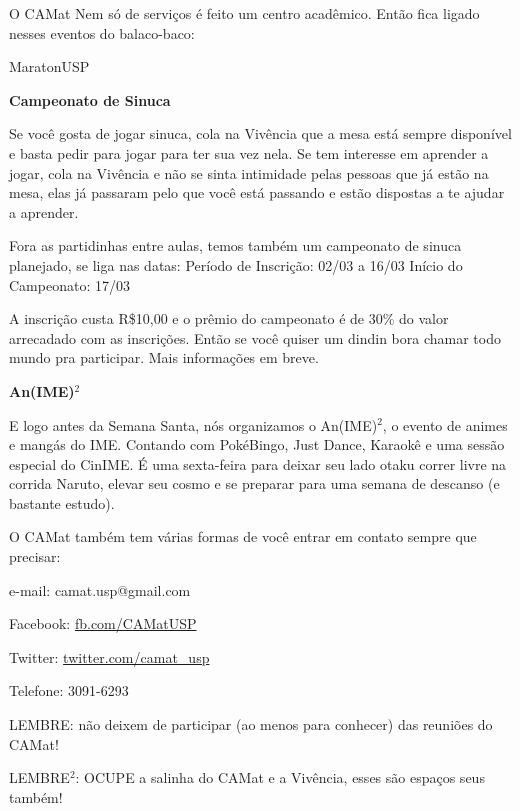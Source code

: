 \begin{secao}{O CAMat}
Nem só de serviços é feito um centro acadêmico. Então fica ligado nesses eventos do balaco-baco:
\begin{subsecao}{MaratonUSP}

\textbf{Campeonato de Sinuca}

Se você gosta de jogar sinuca, cola na Vivência que a mesa está sempre disponível e basta pedir para jogar para ter sua vez nela. Se tem interesse em aprender a jogar, cola na Vivência e não se sinta intimidade pelas pessoas que já estão na mesa, elas já passaram pelo que você está passando e estão dispostas a te ajudar a aprender.

Fora as partidinhas entre aulas, temos também um campeonato de sinuca planejado, se liga nas datas: 
Período de Inscrição: 02/03 a 16/03
Início do Campeonato: 17/03

A inscrição custa R\$10,00 e o prêmio do campeonato é de 30\% do valor arrecadado com as inscrições. Então se você quiser um dindin bora chamar todo mundo pra participar. Mais informações em breve.


\textbf{An(IME)$^2$}

E logo antes da Semana Santa, nós organizamos o An(IME)$^2$, o evento de animes e mangás do IME. Contando com PokéBingo, Just Dance, Karaokê e uma sessão especial do CinIME. É uma sexta-feira para deixar seu lado otaku correr livre na corrida Naruto, elevar seu cosmo e se preparar para uma semana de descanso (e bastante estudo).

O CAMat também tem várias formas de você entrar em contato sempre que precisar:

e-mail: camat.usp@gmail.com
 \item [Facebook:] \url{fb.com/CAMatUSP}
 \item [Twitter:] \url{twitter.com/camat_usp}
 \item [Telefone:] 3091-6293

LEMBRE: não deixem de participar (ao menos para conhecer) das reuniões do
CAMat!

LEMBRE$^2$: OCUPE a salinha do CAMat e a Vivência, esses são espaços seus também!

\end{subsecao}

\end{secao}
